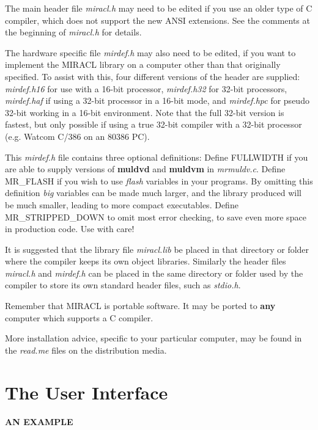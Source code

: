 The main header file {\em miracl.h} may need to be edited if you use  an  older 
type of C compiler,  which does not support the new ANSI extensions.  See 
the comments at the beginning of {\em miracl.h} for details.  

The hardware specific file {\em mirdef.h} may also  need to be edited,  if you
want to implement  the  MIRACL  library  on  a  computer  other than that 
originally specified. To assist with this, four different versions of the 
header are supplied: {\em mirdef.h16} 
for use with a 16-bit processor, {\em mirdef.h32} for 32-bit 
processors, {\em mirdef.haf} if using a 32-bit processor in a 16-bit mode, and 
{\em mirdef.hpc} for pseudo 32-bit working in a 16-bit environment. Note that 
the full 32-bit version is fastest, but only possible if using a true 32-bit 
compiler with a 32-bit processor (e.g. Watcom C/386 on an 80386 PC).

This {\em mirdef.h} file contains three optional definitions: Define FULLWIDTH 
if you are 
able to supply versions of {\bf muldvd} and {\bf muldvm} in {\em mrmuldv.c}. 
Define MR\_FLASH if you wish to use {\em flash} variables in your programs. 
By omitting this definition {\em big} variables can be made much larger, and the 
library produced will be much smaller, leading to more compact executables. 
Define MR\_STRIPPED\_DOWN to omit most error checking, to save even more 
space in production code. Use with care! 

It is suggested that the library file {\em miracl.lib} be placed in that 
directory or folder where the compiler keeps its own object libraries. 
Similarly the header files {\em miracl.h} and {\em mirdef.h} can be placed 
in the same directory or folder used by the compiler to store its own standard 
header files, such as {\em stdio.h}. 

Remember that MIRACL is portable software. It may be ported to {\bf any} 
computer which supports a C compiler.

More installation advice, specific to your particular computer, may be found 
in the {\em read.me} files on the distribution media.

\cleardoublepage 
\chapter{The User Interface}
\vspace{3mm}
{\bf AN EXAMPLE}
\vspace{3mm}

